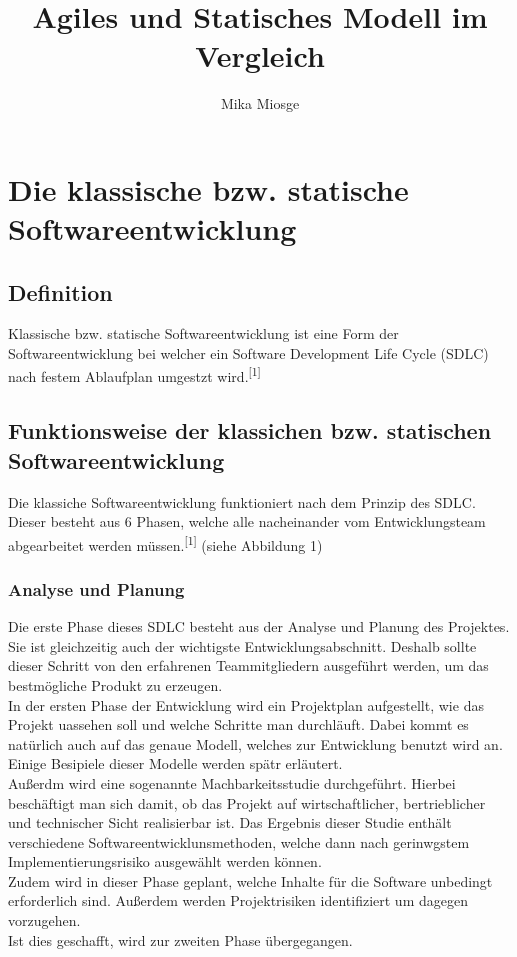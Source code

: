 \documentclass[a4paper, 10pt]{scrartcl}
\title{Agiles und Statisches Modell im Vergleich}
\author{Mika Miosge}
\begin{document}
\section{Die klassische bzw. statische Softwareentwicklung}
\subsection{Definition}
\begin{center}
\large{Klassische bzw. statische Softwareentwicklung ist eine Form der Softwareentwicklung bei welcher ein \glqq Software Development Life Cycle (SDLC)\grqq{} nach festem Ablaufplan umgestzt wird.\textsuperscript{[1]}} 
\end{center}
\subsection{Funktionsweise der klassichen bzw. statischen Softwareentwicklung}
Die klassiche Softwareentwicklung funktioniert nach dem Prinzip des SDLC. Dieser besteht aus 6 Phasen, welche alle nacheinander vom Entwicklungsteam abgearbeitet werden müssen.\textsuperscript{[1]} (siehe Abbildung 1)
\subsubsection{Analyse und Planung}
Die erste Phase dieses SDLC besteht aus der Analyse und Planung des Projektes. Sie ist gleichzeitig auch der wichtigste Entwicklungsabschnitt. Deshalb sollte dieser Schritt von den erfahrenen Teammitgliedern ausgeführt werden, um das bestmögliche Produkt zu erzeugen.\\  
In der ersten Phase der Entwicklung wird ein Projektplan aufgestellt, wie das Projekt uassehen soll und welche Schritte man durchläuft. Dabei kommt es natürlich auch auf das genaue Modell, welches zur Entwicklung benutzt wird an. Einige Besipiele dieser Modelle werden spätr erläutert. \\
Außerdm wird eine sogenannte Machbarkeitsstudie durchgeführt. Hierbei beschäftigt man sich damit, ob das Projekt auf wirtschaftlicher, bertrieblicher und technischer Sicht realisierbar ist. Das Ergebnis dieser Studie enthält verschiedene Softwareentwicklunsmethoden, welche dann nach gerinwgstem Implementierungsrisiko ausgewählt werden können.\\
Zudem wird in dieser Phase geplant, welche Inhalte für die Software unbedingt erforderlich sind. Außerdem werden Projektrisiken identifiziert um dagegen vorzugehen.\\
Ist dies geschafft, wird zur zweiten Phase übergegangen.
\end{document}
